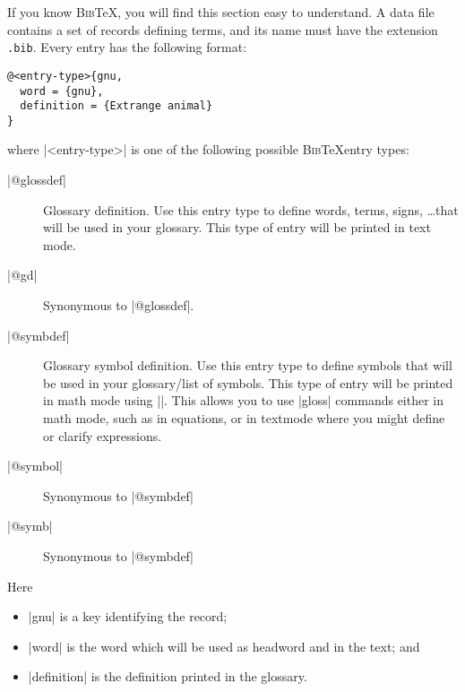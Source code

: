 \documentclass{ltxguide}
\newcommand{\gloss}{\textsf{gloss}}
\newcommand{\bibTeX}{\textsc{Bib}\TeX}
\begin{document}
If you know \bibTeX, you will find this section easy to understand.
A data file contains a set of records defining terms, and its
name must have the extension \texttt{.bib}. Every entry has the
following format:
\begin{verbatim}
@<entry-type>{gnu,
  word = {gnu},
  definition = {Extrange animal}
}
\end{verbatim}
%
where |<entry-type>| is one of the following possible \bibTeX entry types:
\begin{description}
\item[|@glossdef|] Glossary definition.  Use this entry type to define words,
  terms, signs, \dots that will be used in your glossary.  This type of entry
  will be printed in text mode. 

\item[|@gd|] Synonymous to |@glossdef|.

\item[|@symbdef|] Glossary symbol definition.  Use this entry type to define
  symbols that will be used in your glossary/list of symbols.  This type of
  entry will be printed in math mode using |\ensuremath{}|.  This allows you
  to use |\gloss{}| commands either in math mode, such as in equations, or in
  textmode where you might define or clarify expressions.  

\item[|@symbol|] Synonymous to |@symbdef|

\item[|@symb|] Synonymous to |@symbdef|

\end{description}


Here
\begin{itemize}
\item |gnu| is a key identifying the record;
\item |word| is the word which will be used as headword and in the 
  text; and
\item |definition| is the definition printed in the glossary.
\end{itemize}
\end{document}
